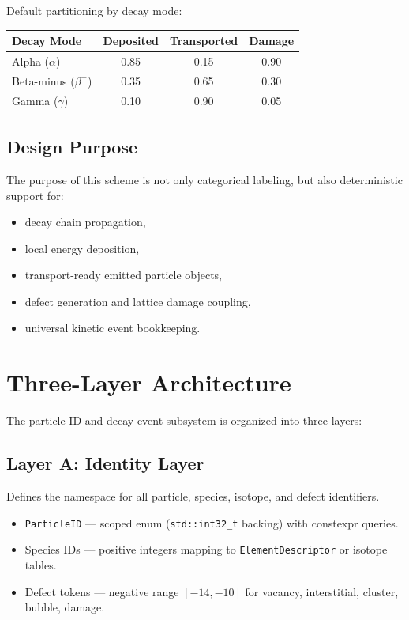 \documentclass[11pt,a4paper]{article}
\begin{document}
Default partitioning by decay mode:

\begin{center}
\begin{tabular}{lccc}
\toprule
\textbf{Decay Mode} & \textbf{Deposited} & \textbf{Transported} & \textbf{Damage} \\
\midrule
Alpha ($\alpha$)     & 0.85 & 0.15 & 0.90 \\
Beta-minus ($\beta^-$) & 0.35 & 0.65 & 0.30 \\
Gamma ($\gamma$)     & 0.10 & 0.90 & 0.05 \\
\bottomrule
\end{tabular}
\end{center}

\subsection{Design Purpose}

The purpose of this scheme is not only categorical labeling, but also deterministic support for:
\begin{itemize}
    \item decay chain propagation,
    \item local energy deposition,
    \item transport-ready emitted particle objects,
    \item defect generation and lattice damage coupling,
    \item universal kinetic event bookkeeping.
\end{itemize}

\section{Three-Layer Architecture}
\label{sec:architecture}

The particle ID and decay event subsystem is organized into three layers:

\subsection{Layer A: Identity Layer}

Defines the namespace for all particle, species, isotope, and defect identifiers.

\begin{itemize}
    \item \texttt{ParticleID} --- scoped enum (\texttt{std::int32\_t} backing) with constexpr queries.
    \item Species IDs --- positive integers mapping to \texttt{ElementDescriptor} or isotope tables.
    \item Defect tokens --- negative range $[-14, -10]$ for vacancy, interstitial, cluster, bubble, damage.
\end{itemize}
\end{document}
